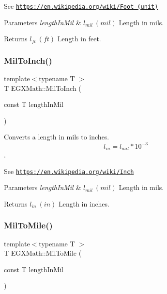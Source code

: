 See \href{https://en.wikipedia.org/wiki/Foot_(unit)}{\tt https\+://en.\+wikipedia.\+org/wiki/\+Foot\+\_\+(unit)} 
\begin{DoxyParams}{Parameters}
{\em length\+In\+Mil} & $ l_{mil}\ (mil)$ Length in mils. \\
\hline
\end{DoxyParams}
\begin{DoxyReturn}{Returns}
$ l_{ft}\ (ft)$ Length in feet. 
\end{DoxyReturn}
\mbox{\label{group___e_g_x_math-_conversions-_length_conversions-_imperial-_mil-_imperial_ga70cc1592b6255e3d14562f09f4b9ab02}} 
\subsubsection{\texorpdfstring{Mil\+To\+Inch()}{MilToInch()}}
{\footnotesize\ttfamily template$<$typename T $>$ \\
T E\+G\+X\+Math\+::\+Mil\+To\+Inch (\begin{DoxyParamCaption}\item[{const T}]{length\+In\+Mil }\end{DoxyParamCaption})}



Converts a length in mils to inches. \[ l_{in}= l_{mil} * 10^{-3} \]. 

See \href{https://en.wikipedia.org/wiki/Inch}{\tt https\+://en.\+wikipedia.\+org/wiki/\+Inch} 
\begin{DoxyParams}{Parameters}
{\em length\+In\+Mil} & $ l_{mil}\ (mil)$ Length in mils. \\
\hline
\end{DoxyParams}
\begin{DoxyReturn}{Returns}
$ l_{in}\ (in)$ Length in inches. 
\end{DoxyReturn}
\mbox{\label{group___e_g_x_math-_conversions-_length_conversions-_imperial-_mil-_imperial_ga297cf60ff93d053d0fc2f6536b2b5681}} 
\subsubsection{\texorpdfstring{Mil\+To\+Mile()}{MilToMile()}}
{\footnotesize\ttfamily template$<$typename T $>$ \\
T E\+G\+X\+Math\+::\+Mil\+To\+Mile (\begin{DoxyParamCaption}\item[{const T}]{length\+In\+Mil }\end{DoxyParamCaption})}



